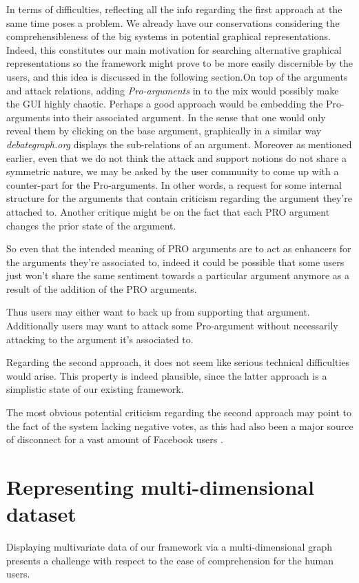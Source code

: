 \documentclass{article}
\begin{document}
{\color{red} 

In terms of difficulties,  reflecting all the info regarding the first approach at the same time poses a problem. We already have our conservations considering the comprehensibleness of the big systems in potential graphical representations. Indeed, this constitutes our main motivation for searching alternative graphical representations so the framework might prove to be more easily discernible by the users, and this idea is discussed in the following section.On top of the arguments and attack relations, adding \textit{Pro-arguments} in to the mix would possibly  make the GUI highly chaotic. Perhaps a good approach would be embedding the Pro-arguments into their associated argument. In the sense that one would only reveal them by clicking on the base argument, graphically in a similar way \textit{debategraph.org} displays the sub-relations of an argument. Moreover as mentioned earlier, even that we do not think the attack and support notions do not share a symmetric nature,  we may be asked by the user community to come up with a counter-part for the Pro-arguments.  In other words, a request for some internal structure for the arguments that contain criticism regarding the argument they're attached to. Another critique might be on the fact that each PRO argument changes the prior state of the argument.}
So even that the intended meaning of PRO arguments are to act as enhancers for the arguments they're associated to, indeed it could be possible that some users just won't share the same sentiment towards a particular argument anymore as a result of the addition of the PRO arguments. {\color{red} Thus users may either want to back up from supporting that argument. Additionally users may want to attack some Pro-argument without necessarily attacking to the argument it's associated to.

Regarding the second approach, it does not seem like serious technical difficulties would arise. This property is indeed plausible, since the latter approach is a simplistic state of our existing framework.} 


The most obvious potential criticism regarding the second approach may point to the fact of the system lacking negative votes, as this had also been a major source of disconnect for a vast amount of Facebook users \cite{FBdislike}.


\section{Representing multi-dimensional dataset} 
Displaying multivariate data of our framework via a multi-dimensional graph presents a challenge with respect to the ease of comprehension for the human users.
\end{document}
